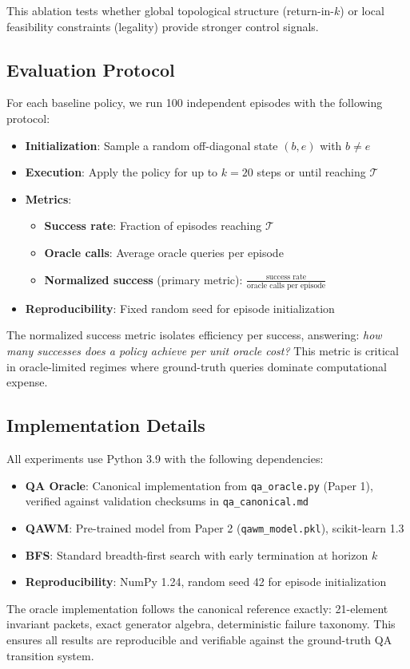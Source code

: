 This ablation tests whether global topological structure (return-in-$k$) or local feasibility constraints (legality) provide stronger control signals.

\subsection{Evaluation Protocol}

For each baseline policy, we run 100 independent episodes with the following protocol:

\begin{itemize}
\item \textbf{Initialization}: Sample a random off-diagonal state $(b,e)$ with $b \ne e$
\item \textbf{Execution}: Apply the policy for up to $k=20$ steps or until reaching $\mathcal{T}$
\item \textbf{Metrics}:
  \begin{itemize}
  \item \textbf{Success rate}: Fraction of episodes reaching $\mathcal{T}$
  \item \textbf{Oracle calls}: Average oracle queries per episode
  \item \textbf{Normalized success} (primary metric): $\frac{\text{success rate}}{\text{oracle calls per episode}}$
  \end{itemize}
\item \textbf{Reproducibility}: Fixed random seed for episode initialization
\end{itemize}

The normalized success metric isolates efficiency per success, answering: \textit{how many successes does a policy achieve per unit oracle cost?} This metric is critical in oracle-limited regimes where ground-truth queries dominate computational expense.

\subsection{Implementation Details}

All experiments use Python 3.9 with the following dependencies:

\begin{itemize}
\item \textbf{QA Oracle}: Canonical implementation from \texttt{qa\_oracle.py} (Paper 1), verified against validation checksums in \texttt{qa\_canonical.md}
\item \textbf{QAWM}: Pre-trained model from Paper 2 (\texttt{qawm\_model.pkl}), scikit-learn 1.3
\item \textbf{BFS}: Standard breadth-first search with early termination at horizon $k$
\item \textbf{Reproducibility}: NumPy 1.24, random seed 42 for episode initialization
\end{itemize}

The oracle implementation follows the canonical reference exactly: 21-element invariant packets, exact generator algebra, deterministic failure taxonomy. This ensures all results are reproducible and verifiable against the ground-truth QA transition system.
